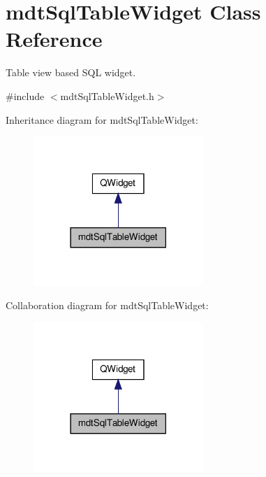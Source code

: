 \hypertarget{classmdt_sql_table_widget}{\section{mdt\-Sql\-Table\-Widget Class Reference}
\label{classmdt_sql_table_widget}
}


Table view based S\-Q\-L widget.  




{\ttfamily \#include $<$mdt\-Sql\-Table\-Widget.\-h$>$}



Inheritance diagram for mdt\-Sql\-Table\-Widget\-:\nopagebreak
\begin{figure}[H]
\begin{center}
\leavevmode
\includegraphics[width=182pt]{classmdt_sql_table_widget__inherit__graph}
\end{center}
\end{figure}


Collaboration diagram for mdt\-Sql\-Table\-Widget\-:\nopagebreak
\begin{figure}[H]
\begin{center}
\leavevmode
\includegraphics[width=182pt]{classmdt_sql_table_widget__coll__graph}
\end{center}
\end{figure}
